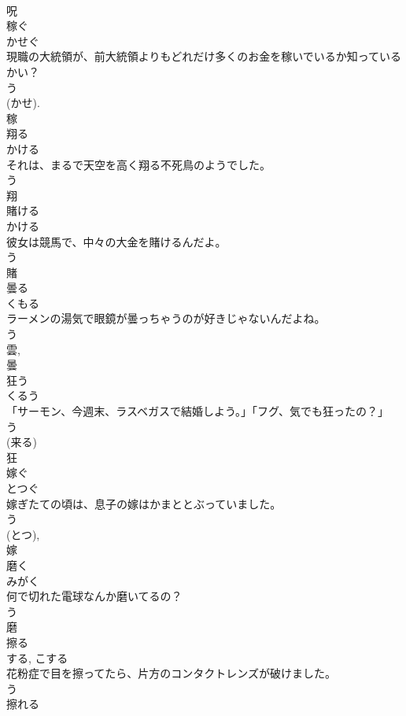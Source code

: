 \documentclass[8pt]{extreport}
\begin{document}
\begin{CJK}{UTF8}{min}
\\	呪	
\\	稼ぐ	
\\	かせぐ	
\\	現職の大統領が、前大統領よりもどれだけ多くのお金を稼いでいるか知っているかい？	
\\	う 
\\	(かせ). 
\\	稼	
\\	翔る	
\\	かける	
\\	それは、まるで天空を高く翔る不死鳥のようでした。	
\\	う 
\\	翔	
\\	賭ける	
\\	かける	
\\	彼女は競馬で、中々の大金を賭けるんだよ。	
\\	う 
\\	賭	
\\	曇る	
\\	くもる	
\\	ラーメンの湯気で眼鏡が曇っちゃうのが好きじゃないんだよね。	
\\	う 
\\	雲, 
\\	曇	
\\	狂う	
\\	くるう	
\\	「サーモン、今週末、ラスベガスで結婚しよう。」「フグ、気でも狂ったの？」	
\\	う 
\\	(来る) 
\\	狂	
\\	嫁ぐ	
\\	とつぐ	
\\	嫁ぎたての頃は、息子の嫁はかまととぶっていました。	
\\	う 
\\	(とつ), 
\\	嫁	
\\	磨く	
\\	みがく	
\\	何で切れた電球なんか磨いてるの？	
\\	う 
\\	磨	
\\	擦る	
\\	する, こする	
\\	花粉症で目を擦ってたら、片方のコンタクトレンズが破けました。	
\\	う 
\\	擦れる 

\end{CJK}
\end{document}
